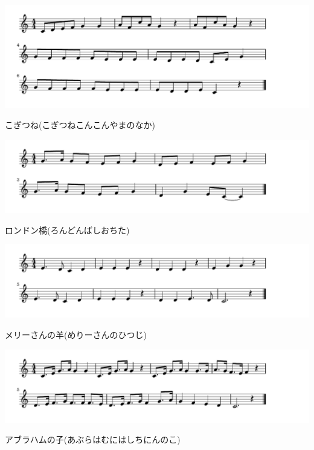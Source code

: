\documentclass[a4paper]{ltjsarticle}
\begin{document}
\includegraphics[clip]{kogitsune_crop.pdf}

\vspace{-10mm} \hspace{10mm}
こぎつね(こぎつねこんこんやまのなか)

\includegraphics[clip]{londonbashi_crop.pdf}

\vspace{-10mm} \hspace{10mm}
ロンドン橋(ろんどんばしおちた)

\includegraphics[clip]{marysanno_crop.pdf}

\vspace{-10mm} \hspace{10mm}
メリーさんの羊(めりーさんのひつじ)

\includegraphics[clip]{abrahamunoko_crop.pdf}

\vspace{-10mm} \hspace{10mm}
アブラハムの子(あぶらはむにはしちにんのこ)
\end{document}
